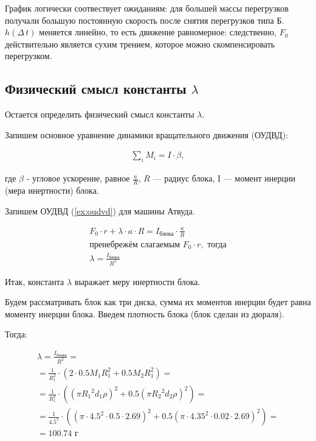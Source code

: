 \documentclass[a4paper,12pt]{report}
\begin{document}
График логически соотвествует ожиданиям: для большей массы перегрузков получали большую постоянную скорость после снятия перегрузков типа Б. $h(\Delta\,t)$ меняется линейно, то есть движение равномерное: следственно, $F_0$ действительно является сухим трением, которое можно скомпенсировать перегрузком. 

\subsection{Физический смысл константы $\lambda$} 

Остается определить физический смысл константы $\lambda$.

Запишем основное уравнение динамики вращательного движения (ОУДВД):

\begin{gather}
	\label{ex:oudvd}
	\sum\limits_i M_i=I\cdot\beta,
\end{gather}

где $\beta$ - угловое ускорение, равное $\frac{a}{R}$, $R$ --- радиус блока, I --- момент инерции (мера инертности) блока.

Запишем ОУДВД (\ref{ex:oudvd}) для машины Атвуда.

\begin{gather}
	\nonumber F_0\cdot{}r+\lambda\cdot{}a\cdot{}R=I_\text{блока}\cdot\frac{a}{R}\\\nonumber
	\text{пренебрежём слагаемым } F_0\cdot{}r, \text{ тогда}\\
	\label{ex:I}\lambda=\frac{I_\text{блока}}{R^2}
\end{gather}

Итак, константа $\lambda$ выражает меру инертности блока. 


Будем рассматривать блок как три диска, сумма их моментов инерции будет равна моменту инерции блока. Введем плотность блока (блок сделан из дюраля).

Тогда:

\begin{gather}
	\nonumber
	\lambda=\frac{I_\text{блока}}{R^2}=\\\nonumber
	=\frac{1}{R_1^2}\cdot(2\cdot0.5M_1R_1^2+0.5M_2R_1^2)=\\\nonumber
	=\frac{1}{R_1^2}\cdot((\pi{}{R_1}^2{d_1}\rho)^2+0.5(\pi{}{R_2}^2{d_2}\rho)^2)=\\\nonumber
	=\frac{1}{4.5^2}\cdot((\pi\cdot{4.5}^2\cdot{0.5}\cdot2.69)^2+0.5(\pi\cdot{4.35}^2\cdot{0.02}\cdot2.69)^2)=\\
	\label{ex:I}=100.74 \text{ г}
\end{gather}
\end{document}
